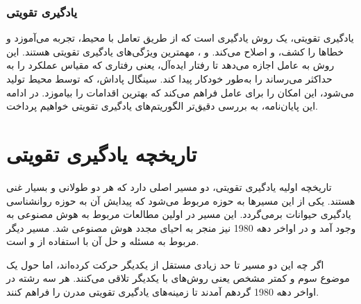 \subsubsection{یادگیری تقویتی}
یادگیری تقویتی، یک روش یادگیری است که از طریق تعامل با محیط، تجربه می‌‌آموزد و خطاها را کشف، و اصلاح می‌کند.  و ، مهمترین ویژگی‌های یادگیری تقویتی هستند. این روش به عامل اجازه می‌دهد تا رفتار ایده‌آل، یعنی رفتاری که مقیاس عملکرد را به حداکثر می‌رساند را به‌طور خودکار پیدا کند. سینگال پاداش، که توسط محیط تولید می‌شود، این امکان را برای عامل فراهم می‌کند که بهترین اقدامات را بیاموزد. در ادامه این پایان‌نامه، به بررسی دقیق‌تر الگوریتم‌های یادگیری تقویتی خواهیم پرداخت.


\section{تاریخچه یادگیری تقویتی}
تاریخچه اولیه یادگیری تقویتی، دو مسیر اصلی دارد که هر دو طولانی و بسیار غنی هستند. یکی از این مسیرها به حوزه  مربوط می‌شود که پیدایش آن به حوزه روانشناسی یادگیری حیوانات برمی‌گردد. این مسیر در اولین مطالعات مربوط به هوش مصنوعی به وجود آمد و در اواخر دهه 1980 نیز منجر به احیای مجدد هوش مصنوعی شد. مسیر دیگر مربوط به مسئله 
\textit{}
و حل آن با استفاده از
\textit{
}
  و
\textit{}
    است.

 اگر چه این دو مسیر تا حد زیادی مستقل از یکدیگر حرکت کرده‌اند،  اما حول یک موضوع سوم و کمتر مشخص یعنی روش‌های 
\textit{}
  با یکدیگر تلاقی می‌کنند. هر سه رشته در اواخر دهه 1980 گرد‌هم آمدند تا زمینه‌های یادگیری تقویتی مدرن را فراهم کنند.



